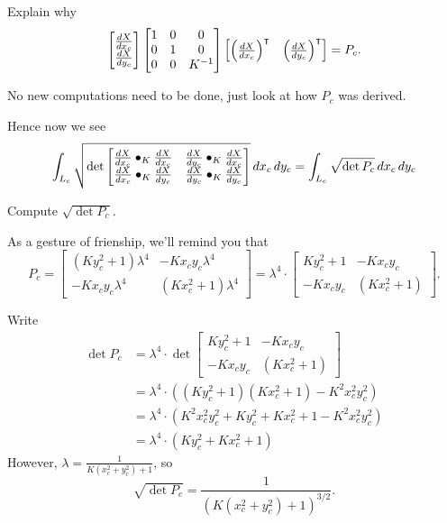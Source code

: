 \documentclass{ximera}
\begin{document}
\begin{problem}
  Explain why
  \[
\begin{bmatrix}
    \dd[X]{x_c}\\
    \dd[X]{y_c}
  \end{bmatrix}
  \begin{bmatrix}
    1 & 0 & 0\\
    0 & 1 & 0\\
    0 & 0 & K^{-1}
  \end{bmatrix}
  \begin{bmatrix}
    \left(\dd[X]{x_c}\right)^\transpose & \left(\dd[X]{y_c}\right)^\transpose
  \end{bmatrix} =P_c.
  \]
  \begin{hint}
    No new computations need to be done, just look at how $P_c$ was derived.
  \end{hint}
\end{problem}

Hence now we see 
\[
\int_{L_c} \sqrt{
  \det
  \begin{bmatrix}
    \dd[X]{x_c}\bullet_K \dd[X]{x_c} & \dd[X]{y_c}\bullet_K \dd[X]{x_c} \\
    \dd[X]{x_c}\bullet_K \dd[X]{y_c} & \dd[X]{y_c}\bullet_K \dd[X]{y_c}
  \end{bmatrix}
}\d x_c\d y_c = \int_{L_c} \sqrt{\det P_c}\d x_c\d y_c
\]
\begin{problem}
  Compute $\sqrt{\det P_c}$.
  \begin{hint}
    As a gesture of frienship, we'll remind you that
    \[
 P_c =
     \begin{bmatrix}
       \left(Ky_c^2+1\right)\lambda^4 & -Kx_{c}y_{c}\lambda^4\\
       -Kx_{c}y_{c}\lambda^4 & \left(Kx_c^2+1\right)\lambda^4
     \end{bmatrix} = \lambda^4 \cdot \begin{bmatrix}
       Ky_c^2+1 & -Kx_{c}y_{c}\\
       -Kx_{c}y_{c} & \left(Kx_c^2+1\right)
     \end{bmatrix}.
    \]
  \end{hint}
  \begin{freeResponse}
    Write
    \begin{align*}
    \det P_c &= \lambda^4\cdot \det \begin{bmatrix}
       Ky_c^2+1 & -Kx_{c}y_{c}\\
       -Kx_{c}y_{c} & \left(Kx_c^2+1\right)
    \end{bmatrix}\\
    &= \lambda^4\cdot\left(\left( Ky_c^2+1\right)\left(Kx_c^2+1\right) - K^2x_{c}^2y_{c}^2\right)\\
    &= \lambda^4\cdot\left(K^2x_{c}^2y_{c}^2 + Ky_c^2+Kx_c^2+1-K^2x_{c}^2y_{c}^2\right)\\
    &= \lambda^4\cdot\left(Ky_c^2+Kx_c^2+1\right)
    \end{align*}
    However, $\lambda = \frac{1}{K\left(x_c^2+y_c^2\right)+1}$, so
    \[
    \sqrt{\det P_c} = \frac{1}{\left(K\left(x_c^2+y_c^2\right)+1\right)^{3/2}}.
    \]
  \end{freeResponse}
\end{problem}
\end{document}
